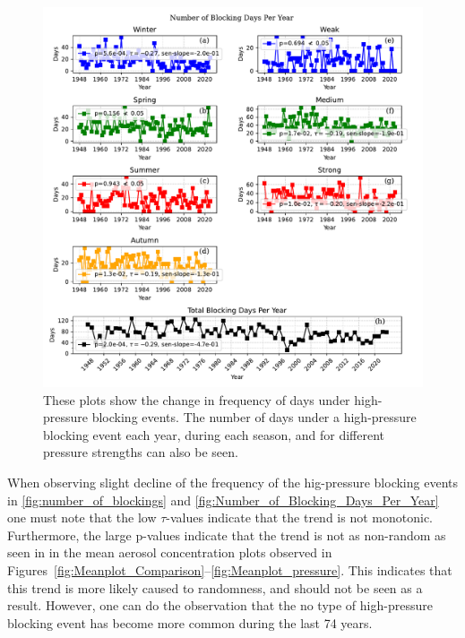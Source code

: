 \begin{figure}[H]
    \centering
    \includegraphics[width=\textwidth]{Figures/blocking_days_per_year_all.pdf}
    \caption{These plots show the change in frequency of days under high-pressure blocking events. The number of days under a high-pressure blocking event each year, during each season, and for different pressure strengths can also be seen.}
    \label{fig:Number_of_Blocking_Days_Per_Year}
\end{figure}

When observing slight decline of the frequency of the hig-pressure blocking events in \autoref{fig:number_of_blockings} and \autoref{fig:Number_of_Blocking_Days_Per_Year} one must note that the low $\tau$-values indicate that the trend is not monotonic. Furthermore, the large p-values indicate that the trend is not as non-random as seen in in the mean aerosol concentration plots observed in Figures~\ref{fig:Meanplot_Comparison}--\ref{fig:Meanplot_pressure}. This indicates that this trend is more likely caused to randomness, and should not be seen as a result. However, one can do the observation that the no type of high-pressure blocking event has become more common during the last 74 years. 
